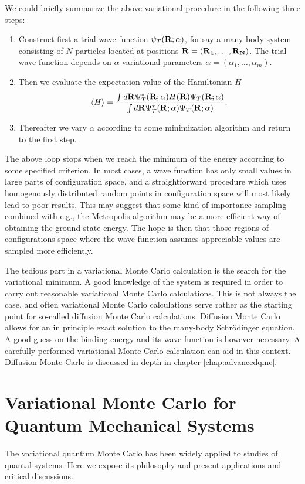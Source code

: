 We could briefly summarize the above variational procedure in the 
following three steps:
\begin{svgraybox}
\begin{enumerate}
\item Construct first a trial wave function $\psi_T({\bf R};\alpha)$, 
for say a many-body
system consisting of $N$ particles located at positions
${\bf R=(R_1,\dots ,R_N)}$. The trial wave function depends
on $\alpha$ variational parameters $\alpha=(\alpha_1,\dots ,\alpha_m)$.
\item Then we evaluate the expectation value of the Hamiltonian $H$ 
\[
   \langle H \rangle =
   \frac{\int d{\bf R}\Psi^{\ast}_{T}({\bf R};\alpha)H({\bf R})
         \Psi_{T}({\bf R};\alpha)}
        {\int d{\bf R}\Psi^{\ast}_{T}({\bf R};\alpha)\Psi_{T}({\bf R};\alpha)}.
\]
\item Thereafter we vary $\alpha$ according to some minimization
algorithm and return to the first step.
\end{enumerate}
\end{svgraybox}
The above loop stops when we reach the minimum of the energy according
to some specified criterion. 
In most cases, a wave function has only small values in large parts of 
configuration space, and a straightforward procedure which uses
homogenously distributed random points in configuration space 
will most likely lead to poor results. This may suggest that some kind
of importance sampling combined with e.g., the Metropolis algorithm 
may be  a more efficient way of obtaining the ground state energy.
The hope is then that those regions of configurations space where
the wave function assumes appreciable values are sampled more 
efficiently. 

The tedious part in a variational Monte Carlo calculation is the search for the variational
minimum. A good knowledge of the system is required in order to carry out
reasonable variational Monte Carlo calculations. This is not always the case, 
and often variational Monte Carlo calculations 
serve rather as the starting
point for so-called diffusion Monte Carlo calculations. Diffusion Monte Carlo allows for an in principle  exact solution to  the many-body Schr\"odinger equation. 
A good guess on the binding energy
and its wave function is however necessary. 
A carefully performed variational Monte Carlo calculation can aid in this context. 
Diffusion Monte Carlo is discussed in depth in chapter \ref{chap:advancedqmc}.

\section{Variational Monte Carlo for Quantum Mechanical Systems} 
The variational quantum Monte Carlo  has been widely applied 
to studies of quantal systems. Here we expose its philosophy and present
applications and critical discussions.

